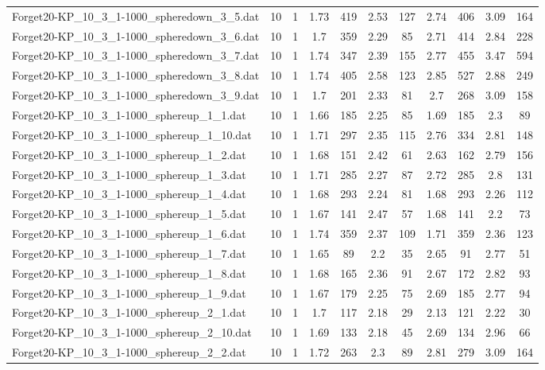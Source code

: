 \begin{table}[!ht]
\begin{tabular}{lcccccccccc}
Forget20-KP\_10\_3\_1-1000\_spheredown\_3\_5.dat & 10 & 1 & 1.73 & 419 & 2.53 & 127 & 2.74 & 406 & 3.09 & 164 \\
Forget20-KP\_10\_3\_1-1000\_spheredown\_3\_6.dat & 10 & 1 & 1.7 & 359 & 2.29 & 85 & 2.71 & 414 & 2.84 & 228 \\
Forget20-KP\_10\_3\_1-1000\_spheredown\_3\_7.dat & 10 & 1 & 1.74 & 347 & 2.39 & 155 & 2.77 & 455 & 3.47 & 594 \\
Forget20-KP\_10\_3\_1-1000\_spheredown\_3\_8.dat & 10 & 1 & 1.74 & 405 & 2.58 & 123 & 2.85 & 527 & 2.88 & 249 \\
Forget20-KP\_10\_3\_1-1000\_spheredown\_3\_9.dat & 10 & 1 & 1.7 & 201 & 2.33 & 81 & 2.7 & 268 & 3.09 & 158 \\
Forget20-KP\_10\_3\_1-1000\_sphereup\_1\_1.dat & 10 & 1 & 1.66 & 185 & 2.25 & 85 & 1.69 & 185 & 2.3 & 89 \\
Forget20-KP\_10\_3\_1-1000\_sphereup\_1\_10.dat & 10 & 1 & 1.71 & 297 & 2.35 & 115 & 2.76 & 334 & 2.81 & 148 \\
Forget20-KP\_10\_3\_1-1000\_sphereup\_1\_2.dat & 10 & 1 & 1.68 & 151 & 2.42 & 61 & 2.63 & 162 & 2.79 & 156 \\
Forget20-KP\_10\_3\_1-1000\_sphereup\_1\_3.dat & 10 & 1 & 1.71 & 285 & 2.27 & 87 & 2.72 & 285 & 2.8 & 131 \\
Forget20-KP\_10\_3\_1-1000\_sphereup\_1\_4.dat & 10 & 1 & 1.68 & 293 & 2.24 & 81 & 1.68 & 293 & 2.26 & 112 \\
Forget20-KP\_10\_3\_1-1000\_sphereup\_1\_5.dat & 10 & 1 & 1.67 & 141 & 2.47 & 57 & 1.68 & 141 & 2.2 & 73 \\
Forget20-KP\_10\_3\_1-1000\_sphereup\_1\_6.dat & 10 & 1 & 1.74 & 359 & 2.37 & 109 & 1.71 & 359 & 2.36 & 123 \\
Forget20-KP\_10\_3\_1-1000\_sphereup\_1\_7.dat & 10 & 1 & 1.65 & 89 & 2.2 & 35 & 2.65 & 91 & 2.77 & 51 \\
Forget20-KP\_10\_3\_1-1000\_sphereup\_1\_8.dat & 10 & 1 & 1.68 & 165 & 2.36 & 91 & 2.67 & 172 & 2.82 & 93 \\
Forget20-KP\_10\_3\_1-1000\_sphereup\_1\_9.dat & 10 & 1 & 1.67 & 179 & 2.25 & 75 & 2.69 & 185 & 2.77 & 94 \\
Forget20-KP\_10\_3\_1-1000\_sphereup\_2\_1.dat & 10 & 1 & 1.7 & 117 & 2.18 & 29 & 2.13 & 121 & 2.22 & 30 \\
Forget20-KP\_10\_3\_1-1000\_sphereup\_2\_10.dat & 10 & 1 & 1.69 & 133 & 2.18 & 45 & 2.69 & 134 & 2.96 & 66 \\
Forget20-KP\_10\_3\_1-1000\_sphereup\_2\_2.dat & 10 & 1 & 1.72 & 263 & 2.3 & 89 & 2.81 & 279 & 3.09 & 164 \\

\end{tabular}
\end{table}
